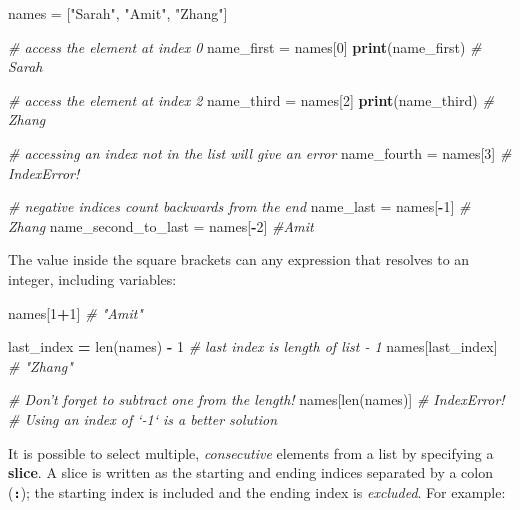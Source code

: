 \documentclass[]{book}
\newenvironment{Shaded}{\begin{snugshade}}{\end{snugshade}}
\newcommand{\KeywordTok}[1]{\textcolor[rgb]{0.13,0.29,0.53}{\textbf{#1}}}
\newcommand{\DecValTok}[1]{\textcolor[rgb]{0.00,0.00,0.81}{#1}}
\newcommand{\StringTok}[1]{\textcolor[rgb]{0.31,0.60,0.02}{#1}}
\newcommand{\CommentTok}[1]{\textcolor[rgb]{0.56,0.35,0.01}{\textit{#1}}}
\newcommand{\OperatorTok}[1]{\textcolor[rgb]{0.81,0.36,0.00}{\textbf{#1}}}
\newcommand{\BuiltInTok}[1]{#1}
\newcommand{\NormalTok}[1]{#1}
\begin{document}
\begin{Shaded}
\begin{Highlighting}[]
\NormalTok{names =}\StringTok{ }\NormalTok{[}\StringTok{"Sarah"}\NormalTok{, }\StringTok{"Amit"}\NormalTok{, }\StringTok{"Zhang"}\NormalTok{]}

\CommentTok{# access the element at index 0}
\NormalTok{name_first =}\StringTok{ }\NormalTok{names[}\DecValTok{0}\NormalTok{]}
\KeywordTok{print}\NormalTok{(name_first)  }\CommentTok{# Sarah}

\CommentTok{# access the element at index 2}
\NormalTok{name_third =}\StringTok{ }\NormalTok{names[}\DecValTok{2}\NormalTok{]}
\KeywordTok{print}\NormalTok{(name_third)  }\CommentTok{# Zhang}

\CommentTok{# accessing an index not in the list will give an error}
\NormalTok{name_fourth =}\StringTok{ }\NormalTok{names[}\DecValTok{3}\NormalTok{]  }\CommentTok{# IndexError!}

\CommentTok{# negative indices count backwards from the end}
\NormalTok{name_last =}\StringTok{ }\NormalTok{names[}\OperatorTok{-}\DecValTok{1}\NormalTok{]  }\CommentTok{# Zhang}
\NormalTok{name_second_to_last =}\StringTok{ }\NormalTok{names[}\OperatorTok{-}\DecValTok{2}\NormalTok{]  }\CommentTok{#Amit}
\end{Highlighting}
\end{Shaded}

The value inside the square brackets can any expression that resolves to
an integer, including variables:

\begin{Shaded}
\begin{Highlighting}[]
\NormalTok{names[}\DecValTok{1}\OperatorTok{+}\DecValTok{1}\NormalTok{]  }\CommentTok{# "Amit"}

\NormalTok{last_index }\OperatorTok{=} \BuiltInTok{len}\NormalTok{(names) }\OperatorTok{-} \DecValTok{1}  \CommentTok{# last index is length of list - 1}
\NormalTok{names[last_index]  }\CommentTok{# "Zhang"}

\CommentTok{# Don't forget to subtract one from the length!}
\NormalTok{names[}\BuiltInTok{len}\NormalTok{(names)]  }\CommentTok{# IndexError!}
\CommentTok{# Using an index of `-1` is a better solution}
\end{Highlighting}
\end{Shaded}

It is possible to select multiple, \emph{consecutive} elements from a
list by specifying a \textbf{slice}. A slice is written as the starting
and ending indices separated by a colon (\textbf{\texttt{:}}); the
starting index is included and the ending index is \emph{excluded}. For
example:
\end{document}
